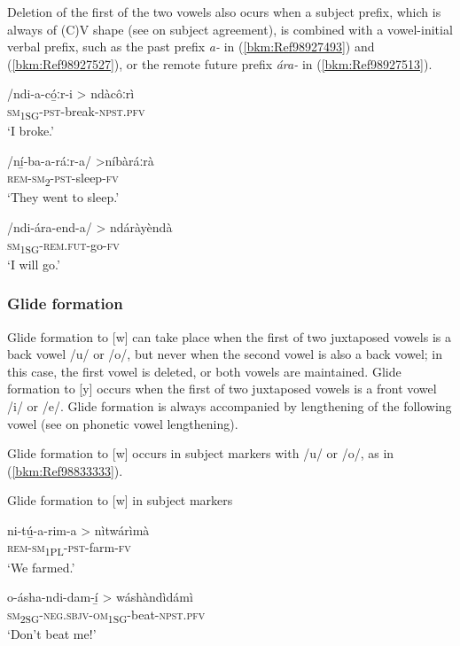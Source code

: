 Deletion of the first of the two vowels also ocurs when a subject prefix, which is always of (C)V shape (see  on subject agreement), is combined with a vowel-initial verbal prefix, such as the past prefix \textit{a-} in (\ref{bkm:Ref98927493}) and (\ref{bkm:Ref98927527}), or the remote future prefix \textit{ára-} in (\ref{bkm:Ref98927513}).

\ea
\label{bkm:Ref98927493}
/ndi-a-có̲ːr-i > ndàcôːrì\\
\textsc{sm}\textsubscript{1SG}-\textsc{pst}-break-\textsc{npst}.\textsc{pfv}\\
\glt ‘I broke.’
\z

\ea
\label{bkm:Ref98927527}
/ní̲-ba-a-ráːr-a/ >níbàráːrà\\
\textsc{rem}-\textsc{sm}\textsubscript{2}-\textsc{pst}-sleep-\textsc{fv}\\
\glt ‘They went to sleep.’
\z

\ea
\label{bkm:Ref98927513}
/ndi-ára-end-a/ > ndáràyèndà\\
\textsc{sm}\textsubscript{1SG}-\textsc{rem}.\textsc{fut}-go-\textsc{fv}\\
\glt ‘I will go.’
\z
\subsubsection{Glide formation}

Glide formation to [w] can take place when the first of two juxtaposed vowels is a back vowel /u/ or /o/, but never when the second vowel is also a back vowel; in this case, the first vowel is deleted, or both vowels are maintained. Glide formation to [y] occurs when the first of two juxtaposed vowels is a front vowel /i/ or /e/. Glide formation is always accompanied by lengthening of the following vowel (see  on phonetic vowel lengthening).

Glide formation to [w] occurs in subject markers with /u/ or /o/, as in (\ref{bkm:Ref98833333}).

\ea
\label{bkm:Ref98833333}
  Glide formation to [w] in subject markers

\ea
ni-tú̲-a-rim-a > nìtwárìmà\\
\textsc{rem}-\textsc{sm}\textsubscript{1PL}-\textsc{pst}-farm-\textsc{fv}\\
\glt ‘We farmed.’

\ex
o-ásha-ndi-dam-í̲ > wáshàndìdámì\\
\textsc{sm}\textsubscript{2SG}-\textsc{neg}.\textsc{sbjv}-\textsc{om}\textsubscript{1SG}-beat-\textsc{npst}.\textsc{pfv}\\
\glt ‘Don’t beat me!’

